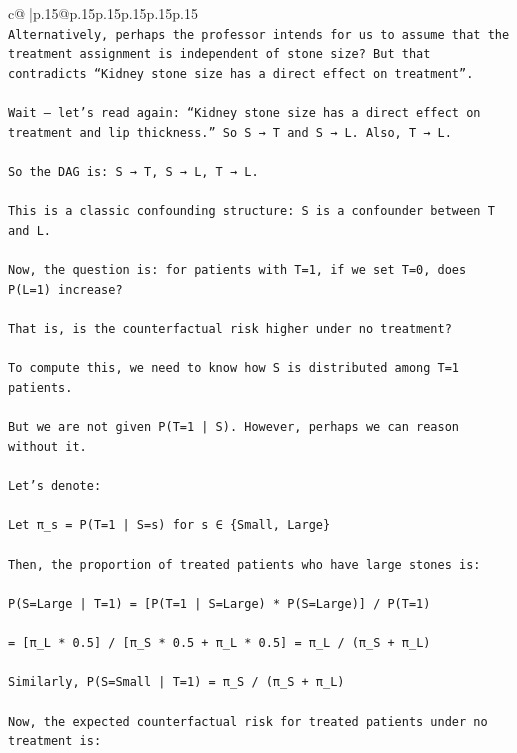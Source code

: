 \documentclass{article}
\begin{document}
{\begin{supertabular}{c@{$\;$}|p{.15\linewidth}@{}p{.15\linewidth}p{.15\linewidth}p{.15\linewidth}p{.15\linewidth}p{.15\linewidth}}
{{{\\ 
\texttt{Alternatively, perhaps the professor intends for us to assume that the treatment assignment is independent of stone size? But that contradicts “Kidney stone size has a direct effect on treatment”.} \\
\\ 
\texttt{Wait — let’s read again: “Kidney stone size has a direct effect on treatment and lip thickness.” So S → T and S → L. Also, T → L.} \\
\\ 
\texttt{So the DAG is: S → T, S → L, T → L.} \\
\\ 
\texttt{This is a classic confounding structure: S is a confounder between T and L.} \\
\\ 
\texttt{Now, the question is: for patients with T=1, if we set T=0, does P(L=1) increase?} \\
\\ 
\texttt{That is, is the counterfactual risk higher under no treatment?} \\
\\ 
\texttt{To compute this, we need to know how S is distributed among T=1 patients.} \\
\\ 
\texttt{But we are not given P(T=1 | S). However, perhaps we can reason without it.} \\
\\ 
\texttt{Let’s denote:} \\
\\ 
\texttt{Let π\_s = P(T=1 | S=s) for s ∈ \{Small, Large\}} \\
\\ 
\texttt{Then, the proportion of treated patients who have large stones is:} \\
\\ 
\texttt{P(S=Large | T=1) = {[}P(T=1 | S=Large) * P(S=Large){]} / P(T=1)} \\
\\ 
\texttt{= {[}π\_L * 0.5{]} / {[}π\_S * 0.5 + π\_L * 0.5{]} = π\_L / (π\_S + π\_L)} \\
\\ 
\texttt{Similarly, P(S=Small | T=1) = π\_S / (π\_S + π\_L)} \\
\\ 
\texttt{Now, the expected counterfactual risk for treated patients under no treatment is:} \\
\\ 
}}}
\end{supertabular}}
\end{document}
